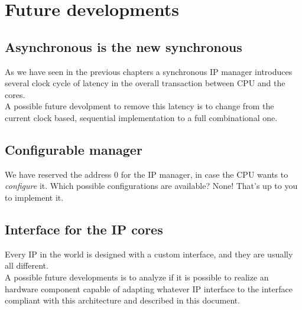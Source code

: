 \chapter{Future developments}\label{future}
\section{Asynchronous is the new synchronous}
As we have seen in the previous chapters a synchronous IP manager introduces several clock cycle of latency in the overall transaction between CPU and the cores.\\
A possible future devolpment to remove this latency is to change from the current clock based, sequential implementation to a full combinational one.
\section{Configurable manager}
We have reserved the address 0 for the IP manager, in case the CPU wants to \textit{configure} it. Which possible configurations are available? None! That's up to you to implement it. 
\section{Interface for the IP cores}
Every IP in the world is designed with a custom interface, and they are usually all different.\\
A possible future developments is to analyze if it is possible to realize an hardware component capable of adapting whatever IP interface to the interface compliant with this architecture and described in this document.